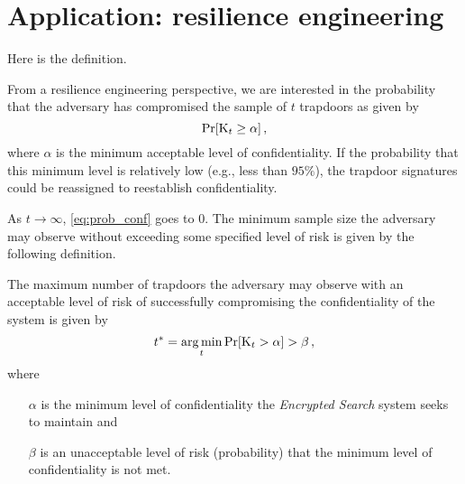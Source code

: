\documentclass[ ../main.tex]{subfiles}
\begin{document}
\section{Application: resilience engineering}
\label{sec:app}
\begin{definition}
Here is the definition.
\end{definition}

From a resilience engineering perspective, we are interested in the probability that the adversary has compromised the sample of $t$ trapdoors as given by
\begin{equation}
\label{eq:prob_conf}
    \Pr[\mathrm{K}_t \geq \alpha]\,,
\end{equation}
where $\alpha$ is the minimum acceptable level of confidentiality. If the probability that this minimum level is relatively low (e.g., less than $95\%$), the trapdoor signatures could be reassigned to reestablish confidentiality.

As $t \to \infty$, \cref{eq:prob_conf} goes to $0$. The minimum sample size the adversary may observe without exceeding some specified level of risk is given by the following definition.
\begin{definition}
The maximum number of trapdoors the adversary may observe with an acceptable level of risk of successfully compromising the confidentiality of the system is given by
\begin{equation}
\label{eq:resample_point}
    t^* = \operatorname*{arg\,min}_{t} \Pr[\mathrm{K}_t > \alpha] > \beta\,,
\end{equation}
where
\begin{enumerate}
    \item[$\alpha$] is the minimum level of confidentiality the \emph{Encrypted Search} system seeks to maintain and
    \item[$\beta$] is an unacceptable level of risk (probability) that the minimum level of confidentiality is not met.
\end{enumerate}
\end{definition}
\end{document}
